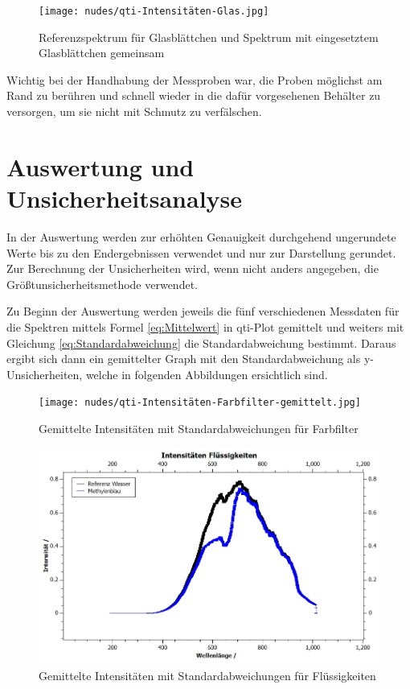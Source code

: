 \documentclass[12pt,a4paper,twoside]{article}
\begin{document}
\begin{figure}[H]
    \centering
    \texttt{[image: nudes/qti-Intensitäten-Glas.jpg]}
    \caption{Referenzspektrum für Glasblättchen und Spektrum mit eingesetztem Glasblättchen gemeinsam}
    \label{fig:Alle3.5Bilder}
\end{figure}

\noindent
Wichtig bei der Handhabung der Messproben war, die Proben möglichst am Rand zu berühren und schnell wieder in die dafür vorgesehenen Behälter zu versorgen, um sie nicht mit Schmutz zu verfälschen.




\section{Auswertung und Unsicherheitsanalyse} %

In der Auswertung werden zur erhöhten Genauigkeit durchgehend ungerundete Werte bis zu den Endergebnissen verwendet und nur zur Darstellung gerundet. \\
Zur Berechnung der Unsicherheiten wird, wenn nicht anders angegeben, die Größtunsicherheitsmethode verwendet. \newline

\noindent
Zu Beginn der Auswertung werden jeweils die fünf verschiedenen Messdaten für die Spektren mittels Formel \ref{eq:Mittelwert} in qti-Plot gemittelt und weiters mit Gleichung \ref{eq:Standardabweichung} die Standardabweichung bestimmt. Daraus ergibt sich dann ein gemittelter Graph mit den Standardabweichung als y-Unsicherheiten, welche in folgenden Abbildungen ersichtlich sind.

\begin{figure}[H]
    \centering
    \texttt{[image: nudes/qti-Intensitäten-Farbfilter-gemittelt.jpg]}
    \caption{Gemittelte Intensitäten mit Standardabweichungen für Farbfilter}
    \label{fig:GemittelteGraphenIntensitätenFarbfilter}
\end{figure}

\begin{figure}[H]
    \centering
    \includegraphics[width=0.6\linewidth]{nudes/qti-Intensitäten-Flüssigkeiten-gemittelt.jpg}
    \caption{Gemittelte Intensitäten mit Standardabweichungen für Flüssigkeiten}
    \label{fig:GemittelteGraphenIntensitätenFlüssigkeiten}
\end{figure}
\end{document}
